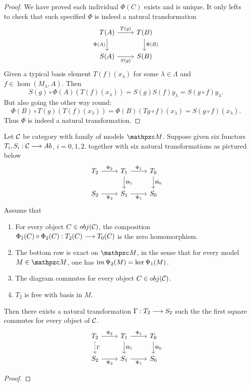 \documentclass[11pt]{book} %
\begin{document}
\begin{proposition}
\begin{proof}
We have proved each individual $\Phi(C)$ exists and is unique. It only lefts to check that such specified $\Phi$ is indeed a natural transformation
\[
\begin{tikzcd}
T(A) \arrow[r, "T(g)"] \arrow[d, "\Phi(A)"'] & T(B) \arrow[d, "\Phi(B)"] \\
S(A) \arrow[r, "S(g)"'] & S(B)
\end{tikzcd}
\]
Given a typical basis element $T(f)(x_\lambda)$ for some $\lambda\in \Lambda$ and $f\in \hom(M_\lambda,A)$. Then 
$$
S(g)\circ \Phi(A)(T(f)(x_\lambda))=S(g)S(f)y_\lambda=S(g\circ f) y_\lambda.
$$
But also going the other way round:
$$
\Phi(B)\circ T(g) (T(f)(x_\lambda))=\Phi(B)(Tg\circ f)(x_\lambda)=S(g\circ f)(x_\lambda).
$$
Thus  $\Phi$ is indeed a natural transformation.
\end{proof}
\begin{lemma}\label{appendixA:lem:A.1.4}
Let ${\cal C}$ be category with family of models $\pzm$. Suppose given six functors
$T_i,S_i:{\cal C}\longrightarrow Ab$, $i=0,1,2$. together with six natural transformations as pictured below
\[
\begin{tikzcd}
T_2 \arrow[r, "\Phi_2"] & T_1 \arrow[r, "\Phi_1"] \arrow[d, "\Theta_1"] & T_0 \arrow[d, "\Theta_0"] \\
S_2 \arrow[r, "\Psi_2"'] & S_1 \arrow[r, "\Psi_1"'] & S_0
\end{tikzcd}
\]
Assume that 
\begin{enumerate}
	\item For every object $C\in obj({\cal C})$, the composition $\Phi_1(C)\circ \Phi_2(C):T_2(C)\longrightarrow T_0(C)$ is the zero homomorphism.
	\item The bottom row is exact on $\pzm$, in the sense that for every model $M\in\pzm$, one has ${\text im\thinspace} \Psi_2(M)=\ker \Psi_1(M)$.
	\item The diagram commutes for every object $C\in obj({\cal C})$.
	\item $T_2$ is free with basis in $M$.
\end{enumerate}
Then there exists a natural transformation $\Gamma:T_2\longrightarrow S_2$ such the the first square commutes for every object of ${\cal C}$.
\[
\begin{tikzcd}
T_2\ar[d, dashed, "\Gamma"] \arrow[r, "\Phi_2"] & T_1 \arrow[r, "\Phi_1"] \arrow[d, "\Theta_1"] & T_0 \arrow[d, "\Theta_0"] \\
S_2 \arrow[r, "\Psi_2"'] & S_1 \arrow[r, "\Psi_1"'] & S_0
\end{tikzcd}
\]
\end{lemma}
\begin{proof}

\end{proof}
\end{proposition}
\end{document}
